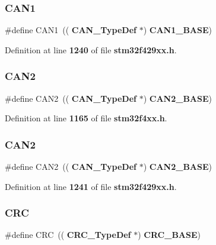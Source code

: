 \subsubsection{C\+A\+N1\hspace{0.1cm}{\footnotesize\ttfamily [2/2]}}
{\footnotesize\ttfamily \#define C\+A\+N1~((\textbf{ C\+A\+N\+\_\+\+Type\+Def} $\ast$) \textbf{ C\+A\+N1\+\_\+\+B\+A\+SE})}



Definition at line \textbf{ 1240} of file \textbf{ stm32f429xx.\+h}.

\mbox{\label{group__Peripheral__declaration_gac5e4c86ed487dc91418b156e24808033}} 
\subsubsection{C\+A\+N2\hspace{0.1cm}{\footnotesize\ttfamily [1/2]}}
{\footnotesize\ttfamily \#define C\+A\+N2~((\textbf{ C\+A\+N\+\_\+\+Type\+Def} $\ast$) \textbf{ C\+A\+N2\+\_\+\+B\+A\+SE})}



Definition at line \textbf{ 1165} of file \textbf{ stm32f4xx.\+h}.

\mbox{\label{group__Peripheral__declaration_gac5e4c86ed487dc91418b156e24808033}} 
\subsubsection{C\+A\+N2\hspace{0.1cm}{\footnotesize\ttfamily [2/2]}}
{\footnotesize\ttfamily \#define C\+A\+N2~((\textbf{ C\+A\+N\+\_\+\+Type\+Def} $\ast$) \textbf{ C\+A\+N2\+\_\+\+B\+A\+SE})}



Definition at line \textbf{ 1241} of file \textbf{ stm32f429xx.\+h}.

\mbox{\label{group__Peripheral__declaration_ga4381bb54c2dbc34500521165aa7b89b1}} 
\subsubsection{C\+RC\hspace{0.1cm}{\footnotesize\ttfamily [1/2]}}
{\footnotesize\ttfamily \#define C\+RC~((\textbf{ C\+R\+C\+\_\+\+Type\+Def} $\ast$) \textbf{ C\+R\+C\+\_\+\+B\+A\+SE})}



